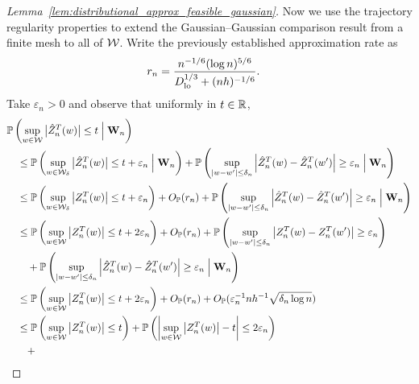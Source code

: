 \begin{proof}[Lemma~\ref{lem:distributional_approx_feasible_gaussian}]

  Now we use the trajectory regularity properties to
  extend the Gaussian--Gaussian comparison result from a finite mesh
  to all of $\mathcal{W}$.
  Write the previously established
  approximation rate as
  \begin{align*}
    r_n
    &=
    \frac{n^{-1/6}(\log n)^{5/6}}
    {D_{\textup{lo}}^{1/3} + (n h)^{-1/6}}.
  \end{align*}
  Take $\varepsilon_n > 0$ and observe that
  uniformly in $t \in \mathbb{R}$,
  \begin{align*}
    &\P\left(
      \sup_{w \in \cW}
      \big| \hat Z_n^T(w) \big|
      \leq t
      \Bigm\vert \bW_n
    \right) \\
    &\quad\leq
    \P\left(
      \sup_{w \in \cW_\delta}
      \big| \hat Z_n^T(w) \big|
      \leq t + \varepsilon_n
      \Bigm\vert \bW_n
    \right)
    + \P\left(
      \sup_{|w-w'| \leq \delta_n}
      \left|
      \hat Z_n^T(w)
      - \hat Z_n^T(w')
      \right|
      \geq \varepsilon_n
      \Bigm\vert \bW_n
    \right) \\
    &\quad\leq
    \P\left(
      \sup_{w \in \cW_\delta}
      \big| Z_n^T(w) \big|
      \leq t + \varepsilon_n
    \right)
    + O_\P(r_n)
    + \P\left(
      \sup_{|w-w'| \leq \delta_n}
      \left|
      \hat Z_n^T(w)
      - \hat Z_n^T(w')
      \right|
      \geq \varepsilon_n
      \Bigm\vert \bW_n
    \right) \\
    &\quad\leq
    \P\left(
      \sup_{w \in \cW}
      \big| Z_n^T(w) \big|
      \leq t + 2\varepsilon_n
    \right)
    + O_\P(r_n)
    + \P\left(
      \sup_{|w-w'| \leq \delta_n}
      \left|
      Z_n^T(w)
      - Z_n^T(w')
      \right|
      \geq \varepsilon_n
    \right) \\
    &\qquad+
    \P\left(
      \sup_{|w-w'| \leq \delta_n}
      \left|
      \hat Z_n^T(w)
      - \hat Z_n^T(w')
      \right|
      \geq \varepsilon_n
      \Bigm\vert \bW_n
    \right) \\
    &\quad\leq
    \P\left(
      \sup_{w \in \cW}
      \big| Z_n^T(w) \big|
      \leq t + 2\varepsilon_n
    \right)
    + O_\P(r_n)
    + O_\P(\varepsilon_n^{-1} n h^{-1} \sqrt{\delta_n \log n}) \\
    &\quad\leq
    \P\left(
      \sup_{w \in \cW}
      \big| Z_n^T(w) \big|
      \leq t
    \right)
    + \P\left(
      \left|
      \sup_{w \in \cW}
      \big| Z_n^T(w) \big|
      - t
      \right|
      \leq 2\varepsilon_n
    \right) \\
    &\qquad+

\end{align*}
\end{proof}
